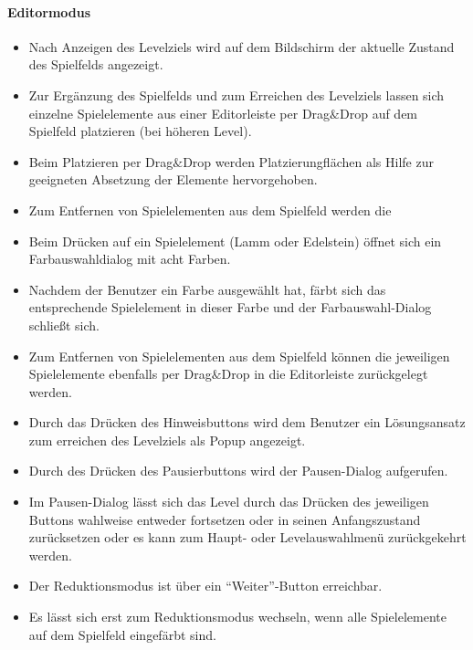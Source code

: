 \paragraph{Editormodus}
\begin{itemize}
	\item Nach Anzeigen des Levelziels wird auf dem Bildschirm der aktuelle Zustand des Spielfelds angezeigt.
	\item Zur Ergänzung des Spielfelds und zum Erreichen des Levelziels lassen sich einzelne Spielelemente aus einer Editorleiste per Drag$\&$Drop auf dem Spielfeld platzieren (bei höheren Level).
	\item Beim Platzieren per Drag$\&$Drop werden Platzierungflächen als Hilfe zur geeigneten Absetzung der Elemente hervorgehoben.
	\item Zum Entfernen von Spielelementen aus dem Spielfeld werden die 
	\item Beim Drücken auf ein Spielelement (Lamm oder Edelstein) öffnet sich ein Farbauswahldialog mit acht Farben.
	\item Nachdem der Benutzer ein Farbe ausgewählt hat, färbt sich das entsprechende Spielelement in dieser Farbe und der Farbauswahl-Dialog schließt sich.
	\item Zum Entfernen von Spielelementen aus dem Spielfeld können die jeweiligen Spielelemente ebenfalls per Drag$\&$Drop in die Editorleiste zurückgelegt werden.
	\item Durch das Drücken des Hinweisbuttons wird dem Benutzer ein Lösungsansatz zum erreichen des Levelziels als Popup angezeigt.
	\item Durch des Drücken des Pausierbuttons wird der Pausen-Dialog aufgerufen.
	\item Im Pausen-Dialog lässt sich das Level durch das Drücken des jeweiligen Buttons wahlweise entweder fortsetzen oder in seinen Anfangszustand zurücksetzen oder es kann zum Haupt- oder Levelauswahlmenü zurückgekehrt werden.
	\item Der Reduktionsmodus ist über ein "`Weiter"'-Button erreichbar. 
	\item Es lässt sich erst zum Reduktionsmodus wechseln, wenn alle Spielelemente auf dem Spielfeld eingefärbt sind.
\end{itemize}

